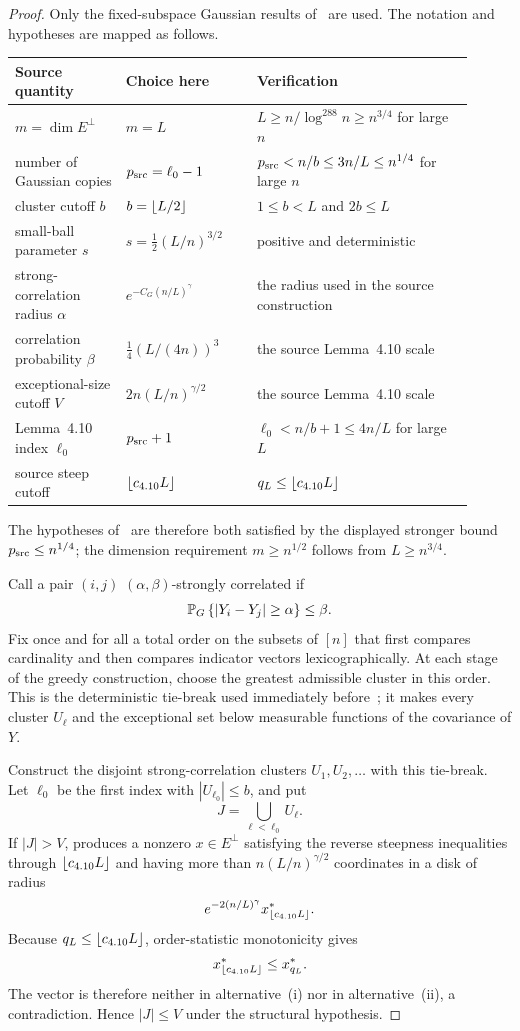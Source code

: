 \begin{proof}
Only the fixed-subspace Gaussian results of~\cite{LLTTY21} are used. The notation and hypotheses are mapped as follows.
\begin{center}
\small
\setlength{\tabcolsep}{3pt}
\begin{tabular}{p{0.22\linewidth}p{0.26\linewidth}p{0.43\linewidth}}
\toprule
\textbf{Source quantity} & \textbf{Choice here} & \textbf{Verification}\\
\midrule
$m=\dim E^\perp$ & $m=L$ & $L\ge n/\log^{288}n\ge n^{3/4}$ for large $n$\\
number of Gaussian copies & $p_{\mathrm{src}}=\ell_0-1$ & $p_{\mathrm{src}}<n/b\le3n/L\le n^{1/4}$ for large $n$\\
cluster cutoff $b$ & $b=\left\lfloor L/2\right\rfloor$ & $1\le b<L$ and $2b\le L$\\
small-ball parameter $s$ & $s=\tfrac12(L/n)^{3/2}$ & positive and deterministic\\
strong-correlation radius $\alpha$ & $e^{-C_G(n/L)^\gamma}$ & the radius used in the source construction\\
correlation probability $\beta$ & $\tfrac14(L/(4n))^3$ & the source Lemma~4.10 scale\\
exceptional-size cutoff $V$ & $2n(L/n)^{\gamma/2}$ & the source Lemma~4.10 scale\\
Lemma~4.10 index $\ell_0$ & $p_{\mathrm{src}}+1$ & $\ell_0<n/b+1\le4n/L$ for large $L$\\
source steep cutoff & $\left\lfloor c_{4.10}L\right\rfloor$ & $q_L\le\left\lfloor c_{4.10}L\right\rfloor$\\
\bottomrule
\end{tabular}
\end{center}
The hypotheses of~\cite[Propositions~4.4 and 4.7]{LLTTY21} are therefore both satisfied by the displayed stronger bound $p_{\mathrm{src}}\le n^{1/4}$; the dimension requirement $m\ge n^{1/2}$ follows from $L\ge n^{3/4}$.

Call a pair $(i,j)$ $(\alpha,\beta)$-strongly correlated if
\[
  \mathbb P_G\left\{|Y_i-Y_j|\ge\alpha\right\}\le\beta.
\]
Fix once and for all a total order on the subsets of $[n]$ that first compares cardinality and then compares indicator vectors lexicographically. At each stage of the greedy construction, choose the greatest admissible cluster in this order. This is the deterministic tie-break used immediately before~\cite[Lemma~4.8]{LLTTY21}; it makes every cluster $U_\ell$ and the exceptional set below measurable functions of the covariance of $Y$.

Construct the disjoint strong-correlation clusters $U_1,U_2,\ldots$ with this tie-break. Let $\ell_0$ be the first index with $|U_{\ell_0}|\le b$, and put
\[
  J=\bigcup_{\ell<\ell_0}U_\ell.
\]
If $|J|>V$, 
\cite[Lemma~4.10]{LLTTY21} produces a nonzero $x\in E^\perp$ satisfying the reverse steepness inequalities through $\left\lfloor c_{4.10}L\right\rfloor$ and having more than $n(L/n)^{\gamma/2}$ coordinates in a disk of radius
\[
  e^{-2(n/L)^\gamma}x_{\left\lfloor c_{4.10}L\right\rfloor}^*.
\]
Because $q_L\le\left\lfloor c_{4.10}L\right\rfloor$, order-statistic monotonicity gives
\[
  x_{\left\lfloor c_{4.10}L\right\rfloor}^*\le x_{q_L}^*.
\]
The vector is therefore neither in alternative~(i) nor in alternative~(ii), a contradiction. Hence $|J|\le V$ under the structural hypothesis.


\end{proof}
